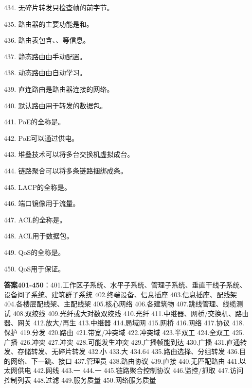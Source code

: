 434. 无碎片转发只检查帧的前\underline{\hspace{2cm}}字节。

435. 路由器的主要功能是\underline{\hspace{2cm}}和\underline{\hspace{2cm}}。

436. 路由表包含\underline{\hspace{2cm}}、\underline{\hspace{2cm}}、\underline{\hspace{2cm}}等信息。

437. 静态路由由\underline{\hspace{2cm}}手动配置。

438. 动态路由由\underline{\hspace{2cm}}自动学习。

439. 直连路由是路由器\underline{\hspace{2cm}}连接的网络。

440. 默认路由用于转发\underline{\hspace{2cm}}的数据包。

441. PoE的全称是\underline{\hspace{4cm}}。

442. PoE可以通过\underline{\hspace{2cm}}供电。

443. 堆叠技术可以将多台交换机虚拟成\underline{\hspace{2cm}}台。

444. 链路聚合可以将多条链路捆绑成\underline{\hspace{2cm}}条。

445. LACP的全称是\underline{\hspace{4cm}}。

446. 端口镜像用于\underline{\hspace{2cm}}流量。

447. ACL的全称是\underline{\hspace{4cm}}。

448. ACL用于\underline{\hspace{2cm}}数据包。

449. QoS的全称是\underline{\hspace{4cm}}。

450. QoS用于保证\underline{\hspace{2cm}}。

\textbf{答案401-450}：401.工作区子系统、水平子系统、管理子系统、垂直干线子系统、设备间子系统、建筑群子系统 402.终端设备、信息插座 403.信息插座、配线架 404.各楼层配线架、主配线架 405.核心网络 406.各建筑物 407.跳线管理、线缆测试 408.双绞线 409.光纤或大对数双绞线 410.光纤 411.中继器、网桥/交换机、路由器、网关 412.放大/再生 413.中继器 414.局域网 415.网桥 416.网络 417.协议 418.保护 419.分发 420.路由 421.带宽/冲突域 422.冲突域 423.半双工 424.全双工 425.广播 426.冲突 427.冲突 428.可能发生冲突 429.广播帧能到达 430.广播 431.直通转发、存储转发、无碎片转发 432.小 433.大 434.64 435.路由选择、分组转发 436.目的网络、下一跳、接口 437.管理员 438.路由协议 439.直接 440.无匹配路由 441.以太网供电 442.网线 443.一 444.一 445.链路聚合控制协议 446.监控/抓取 447.访问控制列表 448.过滤 449.服务质量 450.网络服务质量


